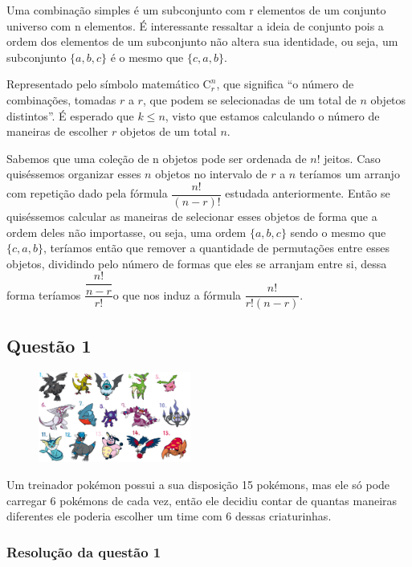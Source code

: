 Uma combinação simples é um subconjunto com r elementos de um conjunto universo com n elementos. É interessante ressaltar a ideia de conjunto pois a ordem dos elementos de um subconjunto não altera sua identidade, ou seja, um subconjunto $\{a, b, c\}$ é o mesmo que $\{c , a, b\}$.

Representado pelo símbolo matemático $\mathrm{C}_r^n$, que significa ``o número de combinações, tomadas $r$ a $r$, que podem se selecionadas de um total de $n$ objetos distintos''.  É esperado que $k \leq n$, visto que estamos calculando o número de maneiras de escolher $r$ objetos de um total $n$.

Sabemos que uma coleção de n objetos pode ser ordenada de $n!$ jeitos. Caso quiséssemos organizar esses $n$ objetos no intervalo de $r$ a $n$ teríamos um arranjo com repetição dado pela fórmula $ \dfrac{n!}{(n - r)!}$ estudada anteriormente. Então se quiséssemos calcular as maneiras de selecionar esses objetos de forma que a ordem deles não importasse, ou seja, uma ordem $\{a, b, c\}$ sendo o mesmo que $\{c , a, b\}$, teríamos então que remover a quantidade de permutações entre esses objetos, dividindo pelo número de formas que eles se arranjam entre si, dessa forma teríamos $\dfrac{\dfrac{n!}{n-r}}{r!}$o que nos induz a fórmula $\dfrac{n!}{r!(n-r)}$.

\subsection*{Questão 1}

\begin{figure}
	\includegraphics[width=5cm, left]{imagens/pokemon.png}
\end{figure}

Um treinador pokémon possui a sua disposição 15 pokémons, mas ele só pode carregar 6 pokémons de cada vez, então ele decidiu contar de quantas maneiras diferentes ele poderia escolher um time com 6 dessas criaturinhas.

\subsubsection*{Resolução da questão 1}

